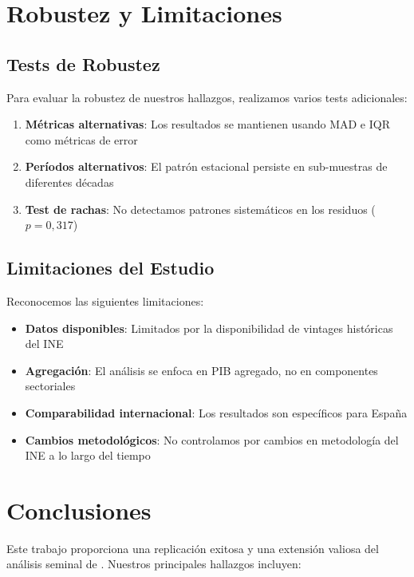 \documentclass{article}
\begin{document}
\section{Robustez y Limitaciones}

\subsection{Tests de Robustez}

Para evaluar la robustez de nuestros hallazgos, realizamos varios tests adicionales:

\begin{enumerate}
\item \textbf{Métricas alternativas}: Los resultados se mantienen usando MAD e IQR como métricas de error
\item \textbf{Períodos alternativos}: El patrón estacional persiste en sub-muestras de diferentes décadas  
\item \textbf{Test de rachas}: No detectamos patrones sistemáticos en los residuos ($p = 0,317$)
\end{enumerate}

\subsection{Limitaciones del Estudio}

Reconocemos las siguientes limitaciones:

\begin{itemize}
\item \textbf{Datos disponibles}: Limitados por la disponibilidad de vintages históricas del INE
\item \textbf{Agregación}: El análisis se enfoca en PIB agregado, no en componentes sectoriales
\item \textbf{Comparabilidad internacional}: Los resultados son específicos para España
\item \textbf{Cambios metodológicos}: No controlamos por cambios en metodología del INE a lo largo del tiempo
\end{itemize}

\section{Conclusiones}

Este trabajo proporciona una replicación exitosa y una extensión valiosa del análisis seminal de \citet{pavia2017}. Nuestros principales hallazgos incluyen:
\end{document}
